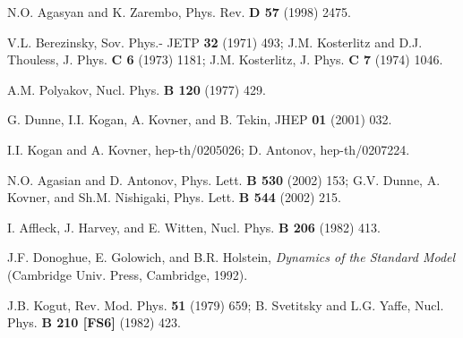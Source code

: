 \documentclass[a4paper,12pt]{article}
\begin{document}
\begin{thebibliography}{100}
N.O. Agasyan and K. Zarembo, Phys. Rev. {\bf D 57} (1998) 2475.

V.L. Berezinsky, Sov. Phys.- JETP {\bf 32} (1971) 493;
J.M. Kosterlitz and D.J. Thouless, J. Phys. {\bf C 6}
(1973) 1181; J.M. Kosterlitz, J. Phys. {\bf C 7} (1974) 1046.

A.M. Polyakov, Nucl. Phys. {\bf B 120} (1977) 429.

G. Dunne, I.I. Kogan, A. Kovner, and B. Tekin, JHEP {\bf 01} (2001) 032.

I.I. Kogan and A. Kovner, hep-th/0205026; D. Antonov, hep-th/0207224.

N.O. Agasian and D. Antonov, Phys. Lett. {\bf B 530} (2002) 153;
G.V. Dunne, A. Kovner, and Sh.M. Nishigaki, Phys. Lett. {\bf B 544} (2002) 215.

I. Affleck, J. Harvey, and E. Witten, Nucl. Phys. {\bf B 206} (1982) 413.

J.F. Donoghue, E. Golowich, and B.R. Holstein, {\it Dynamics of the Standard Model}
(Cambridge Univ. Press, Cambridge, 1992).


J.B. Kogut, Rev. Mod. Phys. {\bf 51} (1979) 659;
B. Svetitsky and L.G. Yaffe, Nucl. Phys. {\bf B 210 [FS6]} (1982) 423.




\end{thebibliography}
\end{document}
